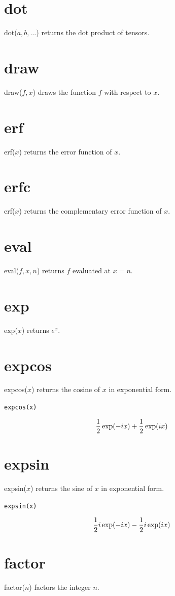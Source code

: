 \documentclass[11pt]{article}
\begin{document}
\section*{dot}
dot($a,b,\ldots$) returns the dot product of tensors.

\section*{draw}
draw($f,x$) draws the function $f$ with respect to $x$.

\section*{erf}
erf($x$) returns the error function of $x$.

\section*{erfc}
erf($x$) returns the complementary error function of $x$.

\section*{eval}
eval($f,x,n$) returns $f$ evaluated at $x=n$.

\section*{exp}
exp($x$) returns $e^x$.

\section*{expcos}
expcos($x$) returns the cosine of $x$ in exponential form.

\medskip
{\tt expcos(x)}

$${1\over2}\exp(-ix)+{1\over2}\exp(ix)$$

\section*{expsin}
expsin($x$) returns the sine of $x$ in exponential form.

\medskip
{\tt expsin(x)}

$${1\over2}i\exp(-ix)-{1\over2}i\exp(ix)$$

\section*{factor}
factor($n$) factors the integer $n$.
\end{document}
